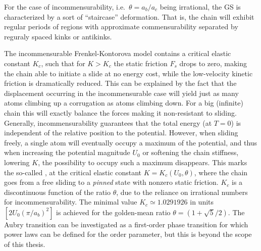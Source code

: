 
For the case of incommensurability, i.e.\ $\theta = a_b/a_c$ being irrational, the
\acrshort{GS} is characterized by a sort of ``staircase''  deformation. That is, the chain will exhibit regular periods of regions with approximate commensurability separated by reguraly spaced kinks or antikinks. 


The incommensurable Frenkel-Kontorova model contains a critical elastic constant $K_c$, such that for $K > K_c$ the static friction $F_s$ drops to zero, making the chain able to initiate a slide at no energy cost, while the low-velocity kinetic friction is dramatically reduced. This can be explained by the
fact that the displacement occurring in the incommensurable case will yield just
as many atoms climbing up a corrugation as atoms climbing down. For a big (infinite) chain this will exactly balance the forces making it
non-resistant to sliding. Generally, incommensurability guarantees that the
total energy (at $T=0$) is independent of the relative position to the
potential. However, when sliding freely, a single atom will eventually occupy a
maximum of the potential, and thus when increasing the potential magnitude $U_0$ or
softening the chain stiffness, lowering $K$, the possibility to occupy such a
maximum disappears. This marks the so-called ,
at the critical elastic constant $K = K_c(U_0, \theta)$, where the chain goes
from a free sliding to a \textit{pinned} state with nonzero static friction.
$K_c$ is a discontinuous function of the ratio $\theta$, due to the reliance on
irrational numbers for incommensurability. The minimal
value $K_c \simeq 1.0291926 $ in units $[2 U_0 (\pi / a_b)^2]$ is achieved for
the golden-mean ratio $\theta = (1+\sqrt{5}/2)$. The Aubry transition can be investigated as a first-order phase transition for which power laws can be defined for the order parameter, but this is beyond the scope of this thesis.




